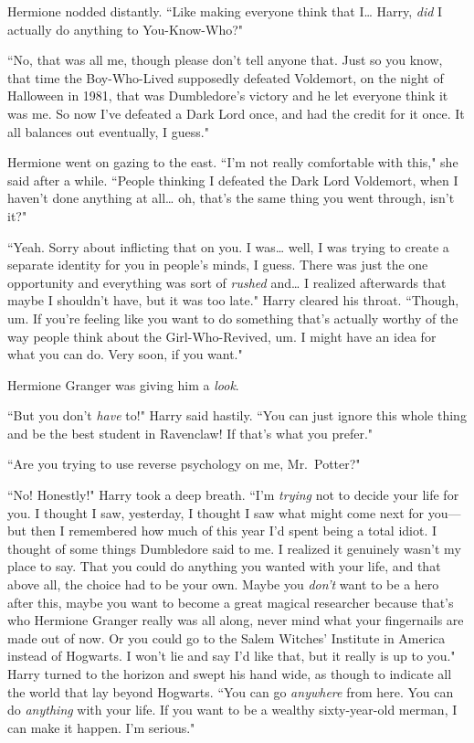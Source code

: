 Hermione nodded distantly. ``Like making everyone think that I{\ldots} Harry, \emph{did} I actually do anything to You-Know-Who?"

``No, that was all me, though please don't tell anyone that. Just so you know, that time the Boy-Who-Lived supposedly defeated Voldemort, on the night of Halloween in 1981, that was Dumbledore's victory and he let everyone think it was me. So now I've defeated a Dark Lord once, and had the credit for it once. It all balances out eventually, I guess."

Hermione went on gazing to the east. ``I'm not really comfortable with this," she said after a while. ``People thinking I defeated the Dark Lord Voldemort, when I haven't done anything at all{\ldots} oh, that's the same thing you went through, isn't it?"

``Yeah. Sorry about inflicting that on you. I was{\ldots} well, I was trying to create a separate identity for you in people's minds, I guess. There was just the one opportunity and everything was sort of \emph{rushed} and{\ldots} I realized afterwards that maybe I shouldn't have, but it was too late." Harry cleared his throat. ``Though, um. If you're feeling like you want to do something that's actually worthy of the way people think about the Girl-Who-Revived, um. I might have an idea for what you can do. Very soon, if you want."

Hermione Granger was giving him a \emph{look}.

``But you don't \emph{have} to!" Harry said hastily. ``You can just ignore this whole thing and be the best student in Ravenclaw! If that's what you prefer."

``Are you trying to use reverse psychology on me, Mr.~Potter?"

``No! Honestly!" Harry took a deep breath. ``I'm \emph{trying} not to decide your life for you. I thought I saw, yesterday, I thought I saw what might come next for you---but then I remembered how much of this year I'd spent being a total idiot. I thought of some things Dumbledore said to me. I realized it genuinely wasn't my place to say. That you could do anything you wanted with your life, and that above all, the choice had to be your own. Maybe you \emph{don't} want to be a hero after this, maybe you want to become a great magical researcher because that's who Hermione Granger really was all along, never mind what your fingernails are made out of now. Or you could go to the Salem Witches' Institute in America instead of Hogwarts. I won't lie and say I'd like that, but it really is up to you." Harry turned to the horizon and swept his hand wide, as though to indicate all the world that lay beyond Hogwarts. ``You can go \emph{anywhere} from here. You can do \emph{anything} with your life. If you want to be a wealthy sixty-year-old merman, I can make it happen. I'm serious."

